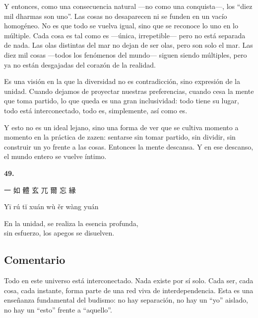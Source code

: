 \documentclass[
  a5paperpaper,
]{article}
\begin{document}
Y entonces, como una consecuencia natural ---no como una conquista---,
los ``diez mil dharmas son uno''. Las cosas no desaparecen ni se funden
en un vacío homogéneo. No es que todo se vuelva igual, sino que se
reconoce lo uno en lo múltiple. Cada cosa es tal como es ---única,
irrepetible--- pero no está separada de nada. Las olas distintas del mar
no dejan de ser olas, pero son solo el mar. Las diez mil cosas ---todos
los fenómenos del mundo--- siguen siendo múltiples, pero ya no están
desgajadas del corazón de la realidad.

Es una visión en la que la diversidad no es contradicción, sino
expresión de la unidad. Cuando dejamos de proyectar nuestras
preferencias, cuando cesa la mente que toma partido, lo que queda es una
gran inclusividad: todo tiene su lugar, todo está interconectado, todo
es, simplemente, así como es.

Y esto no es un ideal lejano, sino una forma de ver que se cultiva
momento a momento en la práctica de zazen: sentarse sin tomar partido,
sin dividir, sin construir un yo frente a las cosas. Entonces la mente
descansa. Y en ese descanso, el mundo entero se vuelve íntimo.

\hfill\break

\hypertarget{04}{}
\begin{verseblock}

\newpage

\begin{center}\textbf{49.}\end{center}

一 如 體 玄 兀 爾 忘 縁

Yī rú tĭ xuán wù ěr wàng yuán

En la unidad, se realiza la esencia profunda,\\
sin esfuerzo, los apegos se disuelven.

\end{verseblock}

\hfill\break

\hypertarget{comentario-48}{%
\subsection{Comentario}\label{comentario-48}}

Todo en este universo está interconectado. Nada existe por sí solo. Cada
ser, cada cosa, cada instante, forma parte de una red viva de
interdependencia. Esta es una enseñanza fundamental del budismo: no hay
separación, no hay un ``yo'' aislado, no hay un ``esto'' frente a
``aquello''.
\end{document}
